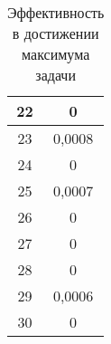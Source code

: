 \begin{table}[ht!]
\begin{tabular}{|c|c|}
		22      & 0                                      \\ \hline
		23      & 0,0008                                 \\ \hline
		24      & 0                                      \\ \hline
		25      & 0,0007                                 \\ \hline
		26      & 0                                      \\ \hline
		27      & 0                                      \\ \hline
		28      & 0                                      \\ \hline
		29      & 0,0006                                 \\ \hline
		30      & 0                                      \\ \hline
	\end{tabular}
	\caption{Эффективность в достижении максимума задачи}
	\label{BigResults2}
\end{table}
\FloatBarrier
